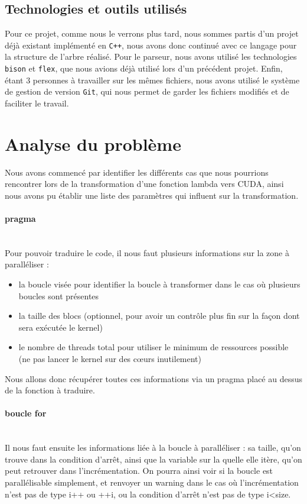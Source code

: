 \documentclass{article}
\begin{document}
	\subsection{Technologies et outils utilisés}
	
	Pour ce projet, comme nous le verrons plus tard, nous sommes partis d'un projet déjà existant implémenté en \verb|C++|, nous avons donc continué avec ce langage pour la structure de l'arbre réalisé.
	Pour le parseur, nous avons utilisé les technologies \verb|bison| et \verb|flex|, que nous avions déjà utilisé lors d'un précédent projet.
	Enfin, étant 3 personnes à travailler sur les mêmes fichiers, nous avons utilisé le système de gestion de version \verb|Git|, qui nous permet de garder les fichiers modifiés et de faciliter le travail.
	
	\newpage	
	
	\section{Analyse du problème}
	Nous avons commencé par identifier les différents cas que nous pourrions rencontrer lors de la transformation d'une fonction lambda vers CUDA, ainsi nous avons pu établir une liste des paramètres qui influent sur la transformation.
	
	\paragraph{pragma}
	~~\\
	\indent
	Pour pouvoir traduire le code, il nous faut plusieurs informations sur la zone à paralléliser : 
	\begin{itemize}
		\item la boucle visée pour identifier la boucle à transformer dans le cas où plusieurs boucles sont présentes
		\item la taille des blocs (optionnel, pour avoir un contrôle plus fin sur la façon dont sera exécutée le kernel)
		\item le nombre de threads total pour utiliser le minimum de ressources possible (ne pas lancer le kernel sur des cœurs inutilement)
	\end{itemize}		
	Nous allons donc récupérer toutes ces informations via un pragma placé au dessus de la fonction à traduire.
	
	\paragraph{boucle for}
	~~\\
	\indent
	Il nous faut ensuite les informations liée à la boucle à paralléliser : sa taille, qu'on trouve dans la condition d'arrêt, ainsi que la variable sur la quelle elle itère, qu'on peut retrouver dans l'incrémentation. On pourra ainsi voir si la boucle est parallélisable simplement, et renvoyer un warning dans le cas où l'incrémentation n'est pas de type i++ ou ++i, ou la condition d'arrêt n'est pas de type i<size.	
	
\end{document}
